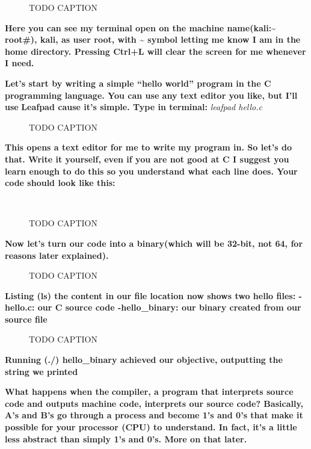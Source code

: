\documentclass[letterpaper]{article}
\newcommand{\sitfig}[3]{
\begin{figure}[H]
\centering
\makebox[\textwidth][c]{
#2
}
\caption{#3}
\label{#1}
\end{figure}
}
\newcommand{\sitgfx}[4][scale=1.0]{
\sitfig{#3}{\texttt{[image: \#2]}}{#4}
}
\begin{document}
{\centering
\sitgfx[width=6.5in,height=1.778in]{FINALWORKINGDOCFORMERLYPRECURSOR-img002.png}{fig:unk}{TODO CAPTION}
 \par}
\textbf{Here you can see my terminal open on the machine name(kali:\~{} root\#), kali, as user root, with \~{} symbol
letting me know I am in the home directory. Pressing Ctrl+L will clear the screen for me whenever I need.\newline
}

\textbf{Let's start by writing a simple ``hello world'' program in the C programming language. You can use any text
editor you like, but I'll use }\textbf{\textcolor[rgb]{0.21960784,0.4627451,0.11372549}{Leafpad }}\textbf{cause it's
simple.\newline
Type in terminal:}\textit{ leafpad hello.c\newline
\ \ }  
\sitgfx[width=4.8693in,height=3.1602in]{FINALWORKINGDOCFORMERLYPRECURSOR-img003.png}{fig:unk}{TODO CAPTION}
 \textbf{ }

\textbf{This opens a text editor for me to write my program in. So let's do that. Write it yourself, even if you are not
good at C I suggest you learn enough to do this so you understand what each line does. Your code should look like
this:}

\textbf{\newline
\ \ }  
\sitgfx[width=4.3854in,height=1.302in]{FINALWORKINGDOCFORMERLYPRECURSOR-img004.png}{fig:unk}{TODO CAPTION}
 

\textbf{Now let's turn our code into a binary(which will be 32-bit, not 64, for reasons later explained).}

  
\sitgfx[width=6.5in,height=0.5555in]{FINALWORKINGDOCFORMERLYPRECURSOR-img005.png}{fig:unk}{TODO CAPTION}
 \textbf{\newline
Listing (ls) the content in our file location now shows two hello files: \newline
{}-hello.c: our C source code\newline
{}-hello\_binary: our binary created from our source file\newline
\ \ }  
\sitgfx[width=4.7602in,height=0.6146in]{FINALWORKINGDOCFORMERLYPRECURSOR-img006.png}{fig:unk}{TODO CAPTION}
 

\textbf{Running (./) hello\_binary achieved our objective, outputting the string we printed}

\textbf{What happens when the }\textbf{\textcolor[rgb]{0.21960784,0.4627451,0.11372549}{compiler}}\textbf{, a program
that interprets source code and outputs machine code, interprets our source code? Basically, A's and B's go through a
process and become 1's and 0's that make it possible for your processor (CPU) to understand. In fact, it's a little
less abstract than simply 1's and 0's. More on that later. }
\end{document}
